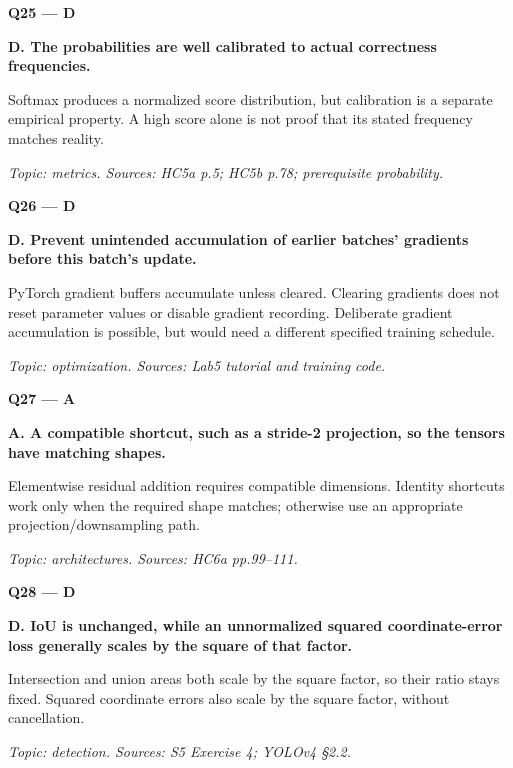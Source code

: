 \documentclass[11pt,a4paper]{article}
\begin{document}
\par\vspace{12pt}
\begin{minipage}{\linewidth}
\textbf{Q25 — D}\par\smallskip
\textbf{D. The probabilities are well calibrated to actual correctness frequencies.}\par
Softmax produces a normalized score distribution,\allowbreak{} but calibration is a separate empirical property. A high score alone is not proof that its stated frequency matches reality.\par
{\small\itshape Topic: metrics. Sources: HC5a p.5; HC5b p.78; prerequisite probability.}

\end{minipage}
\par\vspace{12pt}
\begin{minipage}{\linewidth}
\textbf{Q26 — D}\par\smallskip
\textbf{D. Prevent unintended accumulation of earlier batches' gradients before this batch's update.}\par
PyTorch gradient buffers accumulate unless cleared. Clearing gradients does not reset parameter values or disable gradient recording. Deliberate gradient accumulation is possible,\allowbreak{} but would need a different specified training schedule.\par
{\small\itshape Topic: optimization. Sources: Lab5 tutorial and training code.}

\end{minipage}
\par\vspace{12pt}
\begin{minipage}{\linewidth}
\textbf{Q27 — A}\par\smallskip
\textbf{A. A compatible shortcut,\allowbreak{} such as a stride-2 projection,\allowbreak{} so the tensors have matching shapes.}\par
Elementwise residual addition requires compatible dimensions. Identity shortcuts work only when the required shape matches; otherwise use an appropriate projection/\allowbreak{}downsampling path.\par
{\small\itshape Topic: architectures. Sources: HC6a pp.99–111.}

\end{minipage}
\par\vspace{12pt}
\begin{minipage}{\linewidth}
\textbf{Q28 — D}\par\smallskip
\textbf{D. IoU is unchanged,\allowbreak{} while an unnormalized squared coordinate-error loss generally scales by the square of that factor.}\par
Intersection and union areas both scale by the square factor,\allowbreak{} so their ratio stays fixed. Squared coordinate errors also scale by the square factor,\allowbreak{} without cancellation.\par
{\small\itshape Topic: detection. Sources: S5 Exercise 4; YOLOv4 §2.2.}

\end{minipage}
\end{document}

